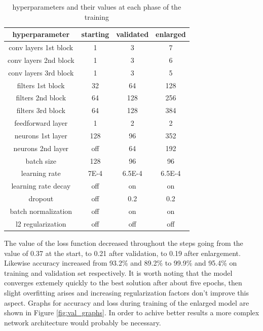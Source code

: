 \documentclass[12pt]{article}
\begin{document}
\begin{table}
	\centering
	\begin{tabular}{|c|c|c|c|} 
		\hline
		\textbf{hyperparameter} & \textbf{starting} & \textbf{validated} & \textbf{enlarged}\\
		\hline
		conv layers 1st block & 1 & 3 & 7\\
		conv layers 2nd block & 1 & 3 & 6\\ 
		conv layers 3rd block & 1 & 3 & 5\\ 
		filters 1st block & 32 & 64 & 128\\
		filters 2nd block & 64 & 128 & 256\\
		filters 3rd block & 64 & 128 & 384\\ 
		feedforward layer & 1 & 2 & 2\\
		neurons 1st layer & 128 & 96 & 352\\
		neurons 2nd layer & off & 64 & 192\\
		batch size & 128 & 96 & 96\\
		learning rate & 7E-4 & 6.5E-4 & 6.5E-4\\
		learning rate decay & off & on & on\\
		dropout & off & 0.2 & 0.2\\
		batch normalization & off & on & on\\
		l2 regularization & off & off & off\\
		\hline
	\end{tabular}
	\caption{hyperparameters and their values at each phase of the training}
	\label{tab:def-hyper}
\end{table}

The value of the loss function decreased throughout the steps going from the value of 0.37 at the start, to 0.21 after validation, to 0.19 after enlargement. Likewise accuracy increased from 93.2\% and 89.2\% to 99.9\% and 95.4\% on training and validation set respectively. It is worth noting that the model converges extemely quickly to the best solution after about five epochs, then slight overfitting arises and increasing regularization factors don't improve this aspect. Graphs for accuracy and loss during training of the enlarged model are shown in Figure \ref{fig:val_graphs}. In order to achive better results a more complex network architecture would probably be necessary.
\end{document}
